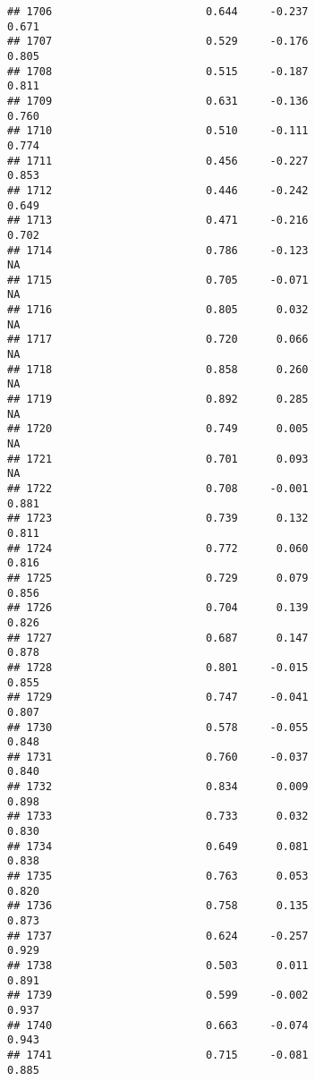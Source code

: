 \documentclass[
]{article}
\begin{document}
\begin{verbatim}
## 1706                        0.644     -0.237                     0.671
## 1707                        0.529     -0.176                     0.805
## 1708                        0.515     -0.187                     0.811
## 1709                        0.631     -0.136                     0.760
## 1710                        0.510     -0.111                     0.774
## 1711                        0.456     -0.227                     0.853
## 1712                        0.446     -0.242                     0.649
## 1713                        0.471     -0.216                     0.702
## 1714                        0.786     -0.123                        NA
## 1715                        0.705     -0.071                        NA
## 1716                        0.805      0.032                        NA
## 1717                        0.720      0.066                        NA
## 1718                        0.858      0.260                        NA
## 1719                        0.892      0.285                        NA
## 1720                        0.749      0.005                        NA
## 1721                        0.701      0.093                        NA
## 1722                        0.708     -0.001                     0.881
## 1723                        0.739      0.132                     0.811
## 1724                        0.772      0.060                     0.816
## 1725                        0.729      0.079                     0.856
## 1726                        0.704      0.139                     0.826
## 1727                        0.687      0.147                     0.878
## 1728                        0.801     -0.015                     0.855
## 1729                        0.747     -0.041                     0.807
## 1730                        0.578     -0.055                     0.848
## 1731                        0.760     -0.037                     0.840
## 1732                        0.834      0.009                     0.898
## 1733                        0.733      0.032                     0.830
## 1734                        0.649      0.081                     0.838
## 1735                        0.763      0.053                     0.820
## 1736                        0.758      0.135                     0.873
## 1737                        0.624     -0.257                     0.929
## 1738                        0.503      0.011                     0.891
## 1739                        0.599     -0.002                     0.937
## 1740                        0.663     -0.074                     0.943
## 1741                        0.715     -0.081                     0.885

\end{verbatim}
\end{document}
